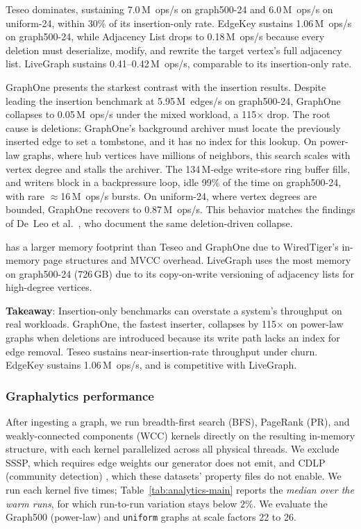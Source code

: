 Teseo dominates, sustaining 7.0\,M~ops/s on graph500-24 and 6.0\,M~ops/s on
uniform-24, within 30\% of its insertion-only rate.
\project{} EdgeKey sustains 1.06\,M~ops/s on graph500-24, while \project{}
Adjacency List drops to 0.18\,M~ops/s because every deletion must
deserialize, modify, and rewrite the target vertex's full adjacency list.
LiveGraph sustains 0.41--0.42\,M~ops/s, comparable to its insertion-only rate.

GraphOne presents the starkest contrast with the insertion results.
Despite leading the insertion benchmark at 5.95\,M~edges/s on graph500-24,
GraphOne collapses to 0.05\,M~ops/s under the mixed workload, a 115$\times$
drop.
The root cause is deletions: GraphOne's background archiver must locate the
previously inserted edge to set a tombstone, and it has no index for this
lookup.
On power-law graphs, where hub vertices have millions of neighbors, this
search scales with vertex degree and stalls the archiver.
The 134\,M-edge write-store ring buffer fills, and writers block in a
backpressure loop, idle 99\% of the time on graph500-24, with rare
$\approx$16\,M~ops/s bursts.
On uniform-24, where vertex degrees are bounded, GraphOne recovers to
0.87\,M~ops/s.
This behavior matches the findings of De~Leo et al.~\cite{teseo2021deLeo}, who document the same deletion-driven collapse.

\project{} has a larger memory footprint than Teseo and
GraphOne due to WiredTiger's in-memory page structures and MVCC overhead.
LiveGraph uses the most memory on graph500-24 (726\,GB) due to its
copy-on-write versioning of adjacency lists for high-degree vertices.

\textbf{Takeaway}: Insertion-only benchmarks can overstate a system's throughput on real workloads. 
GraphOne, the fastest inserter, collapses by 115$\times$ on power-law graphs when deletions are introduced because its write path lacks an index for edge removal. 
Teseo sustains near-insertion-rate throughput under churn. 
\project{} EdgeKey sustains 1.06\,M~ops/s, and is competitive with LiveGraph.

\subsubsection{Graphalytics performance}
After ingesting a graph, we run breadth-first search
(BFS), PageRank (PR), and weakly-connected components (WCC) kernels directly on the resulting in-memory structure, with each kernel parallelized across all physical threads.
We exclude SSSP, which requires edge weights our generator does not emit, and CDLP (community detection) , which these datasets' property files do not enable.
We run each kernel five times; Table~\ref{tab:analytics-main} reports the \emph{median over the warm runs}, for which run-to-run variation stays below $2\%$. We evaluate the Graph500 (power-law) and \texttt{uniform} graphs at scale factors 22 to 26.


